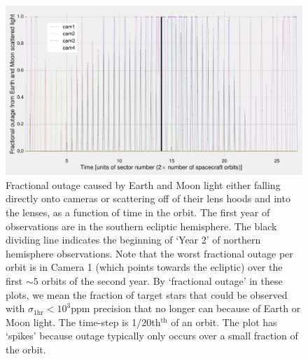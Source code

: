 \begin{figure}[!t]
	\centering
	\includegraphics[angle=90,width=\textwidth]{figures/outage_earth_moon_primary.pdf}
	\caption{Fractional outage caused by Earth and Moon light either falling directly onto \tesss cameras or scattering off of their lens hoods and into the lenses, as a function of time in the orbit. The first year of observations are in the southern ecliptic hemisphere. The black dividing line indicates the beginning of `Year 2' of northern hemisphere observations. Note that the worst fractional outage per orbit is in Camera 1 (which points towards the ecliptic) over the first $\sim 5$ orbits of the second year.
	By `fractional outage' in these plots, we mean the fraction of target stars that could be observed with $\sigma_\mathrm{1hr} < 10^3\mathrm{ppm}$ precision that no longer can because of Earth or Moon light. 
	The time-step is 1/20th$^\mathrm{th}$ of an orbit.
	The plot has `spikes' because outage typically only occurs over a small fraction of the orbit.}
	\label{fig:earth_moon_primary}
\end{figure}

